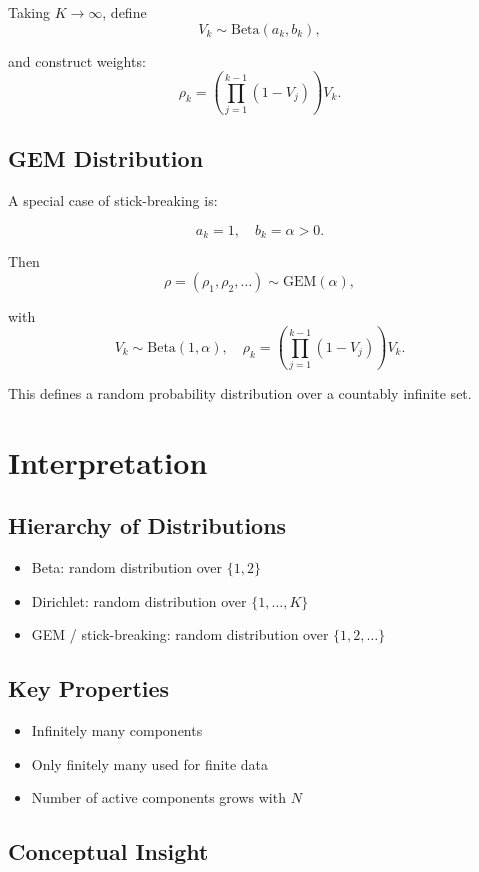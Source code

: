\documentclass[12pt,oneside]{book}
\numberwithin{equation}{section}
\theoremstyle{definition}
\theoremstyle{plain}
\theoremstyle{remark}
\begin{document}
Taking $K \to \infty$, define
\[
V_k \sim \mathrm{Beta}(a_k, b_k),
\]

and construct weights:
\[
\rho_k = \left(\prod_{j=1}^{k-1} (1 - V_j)\right) V_k.
\]

\subsection{GEM Distribution}

A special case of stick-breaking is:

\[
a_k = 1, \quad b_k = \alpha > 0.
\]

Then
\[
\rho = (\rho_1, \rho_2, \ldots) \sim \mathrm{GEM}(\alpha),
\]

with
\[
V_k \sim \mathrm{Beta}(1, \alpha),
\quad
\rho_k = \left(\prod_{j=1}^{k-1} (1 - V_j)\right) V_k.
\]

This defines a random probability distribution over a countably infinite set.

\section{Interpretation}

\subsection*{Hierarchy of Distributions}

\begin{itemize}
\item Beta: random distribution over $\{1,2\}$
\item Dirichlet: random distribution over $\{1,\ldots,K\}$
\item GEM / stick-breaking: random distribution over $\{1,2,\ldots\}$
\end{itemize}

\subsection*{Key Properties}

\begin{itemize}
\item Infinitely many components
\item Only finitely many used for finite data
\item Number of active components grows with $N$
\end{itemize}

\subsection*{Conceptual Insight}
\end{document}
